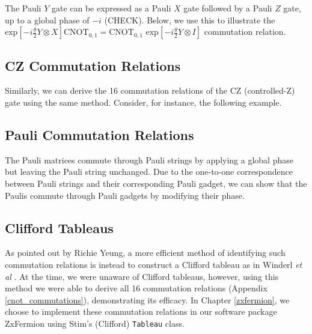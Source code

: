 The Pauli $Y$ gate can be expressed as a Pauli $X$ gate followed by a Pauli $Z$ gate, up to a global phase of $-i$ (CHECK). Below, we use this to illustrate the $\text{exp} \left[ - i\frac{\theta}{2} Y \otimes X \right] \text{CNOT}_{0, 1} = \text{CNOT}_{0, 1} \,\, \text{exp} \left[ - i\frac{\theta}{2} Y \otimes I \right]$ commutation relation.



\subsection{CZ Commutation Relations}

Similarly, we can derive the 16 commutation relations of the CZ (controlled-Z) gate using the same method. Consider, for instance, the following example.


\subsection{Pauli Commutation Relations}

The Pauli matrices commute through Pauli strings by applying a global phase but leaving the Pauli string unchanged. Due to the one-to-one correspondence between Pauli strings and their corresponding Pauli gadget, we can show that the Paulis commute through Pauli gadgets by modifying their phase.


\subsection{Clifford Tableaus}

As pointed out by Richie Yeung, a more efficient method of identifying such commutation relations is instead to construct a Clifford tableau as in Winderl \textit{et al} \cite{Yeung2023}. At the time, we were unaware of Clifford tableaus, however, using this method we were able to derive all 16 commutation relations (Appendix \ref{cnot_commutations}), demonstrating its efficacy. In Chapter \ref{zxfermion}, we choose to implement these commutation relations in our software package ZxFermion using Stim's (Clifford) \lstinline{Tableau} class.

